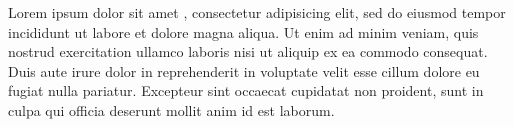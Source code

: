 \documentclass[10pt]{article}
\begin{document}


Lorem ipsum dolor sit amet \cite{CTAN}, consectetur adipisicing elit, sed do
eiusmod tempor incididunt ut labore et dolore magna aliqua. Ut enim ad minim
veniam, quis nostrud exercitation ullamco laboris nisi ut aliquip ex ea commodo
consequat. Duis aute irure dolor in reprehenderit in voluptate velit esse cillum
dolore eu fugiat nulla pariatur. Excepteur sint occaecat cupidatat non proident,
sunt in culpa qui officia deserunt mollit anim id est laborum.



\end{document}
